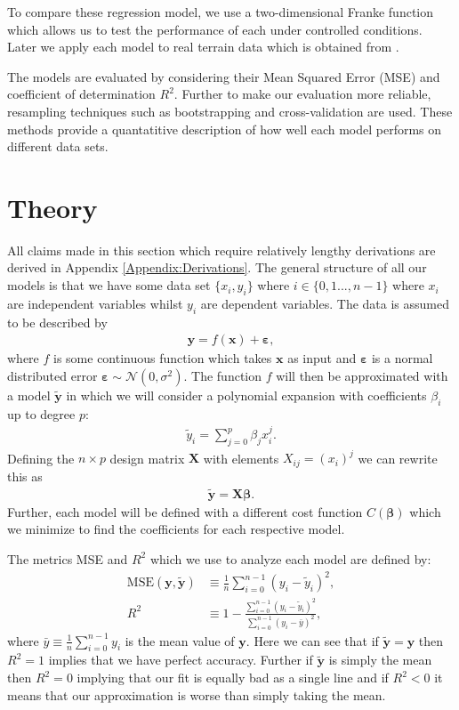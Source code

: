 \documentclass[%
reprint,
amsmath,amssymb,
aps,
pra,
]{revtex4-2}
\begin{document}
To compare these regression model, we use a two-dimensional Franke function which allows us to test the performance of each under controlled conditions. Later we apply each model to real terrain data which is obtained from \cite{USGS_EarthExplorer}.

The models are evaluated by considering their Mean Squared Error (MSE) and coefficient of determination $R^2$. Further to make our evaluation more reliable, resampling techniques such as bootstrapping and cross-validation are used. These methods provide a quantatitive description of how well each model performs on different data sets.
\section{Theory}
All claims made in this section which require relatively lengthy derivations are derived in Appendix \ref{Appendix:Derivations}. The general structure of all our models is that we have some data set $\{x_i,y_i\}$ where $i\in\{0,1...,n-1\}$ where $x_i$ are independent variables whilst $y_i$ are dependent variables. The data is assumed to be described by
\begin{align}
	\bm y=f(\bm x)+\bm \varepsilon,
	\label{eq:data}
\end{align}
where $f$ is some continuous function which takes $\bm x$ as input and $\bm\varepsilon$ is a normal distributed error $\bm\varepsilon\sim\mathcal{N}(0,\sigma^2)$. The function $f$ will then be approximated with a model $\tilde{\bm y}$ in which we will consider a polynomial expansion with coefficients $\beta_i$ up to degree $p$:
\begin{align}
	\tilde{y}_i=\sum_{j=0}^{p}\beta_j x_i^j.
	\label{eq:model}
\end{align}
Defining the $n\times p$ design matrix $\bm X$ with elements $X_{ij}=(x_i)^j$ we can rewrite this as
\begin{align}
	\tilde{\bm y}=\bm X\bm\beta.
\end{align}
Further, each model will be defined with a different cost function $C(\bm\beta)$ which we minimize to find the coefficients for each respective model.

The metrics MSE and $R^2$ which we use to analyze each model are defined by:
\begin{align}
	\text{MSE}(\bm y,\tilde{\bm{y}})&\equiv\frac{1}{n}\sum_{i=0}^{n-1}(y_i-\tilde y_i)^2,\\
	R^2&\equiv1-\frac{\sum_{i=0}^{n-1}(y_i-\tilde y_i)^2}{\sum_{i=0}^{n-1}(y_i-\bar y)^2},
\end{align}
where $\bar y\equiv\frac{1}{n}\sum_{i=0}^{n-1}y_i$ is the mean value of $\bm y$. Here we can see that if $\tilde{\bm{y}}=\bm y$ then $R^2=1$ implies that we have perfect accuracy. Further if $\tilde{\bm{y}}$ is simply the mean then $R^2=0$ implying that our fit is equally bad as a single line and if $R^2<0$ it means that our approximation is worse than simply taking the mean.
\end{document}
